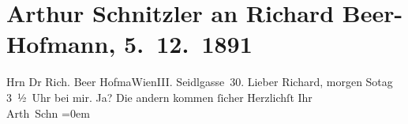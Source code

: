 

         
         \renewcommand{\erwaehntePersonen}{Personen: Richard Beer-Hofmann, Hugo von Hofmannsthal, Felix Salten}
         \renewcommand{\erwaehnteOrte}{Orte: III., Landstraße, Seidlgasse, Wien}
         \renewcommand{\erwaehnteWerke}{}
               \section[Arthur Schnitzler an Richard Beer-Hofmann, 5. 12. 1891]{ Arthur Schnitzler an Richard Beer-Hofmann, 5. 12. 1891}\nopagebreak{}\rehead{ }\begin{ledgroupsized}[t]{13cm}\normalsize\beginnumbering \toendnotes[C]{\smallbreak\pagebreak[2]} 
\toendnotes[C]{\smallbreak}\pstart{}{\pb}Hrn Dr Rich. Beer Hofma{\geminationn}\pend{}\pstart{}Wien\pend{}\pstart{}III. Seidlgasse 30.\pend{}{\bigskip}\pstart
           \noindent{}{\pb}Lieber Richard, morgen So{\geminationn}tag{ }3 ½ Uhr bei mir. Ja? Die andern kommen ſicher \pend
           \pstart
           Herzlichſt Ihr{\\[\baselineskip]}\spacefill\mbox{Arth Schn}\pend
           \leftskip=0em{}
         
         \endnumbering{}\end{ledgroupsized}  \newcommand{\dateiname}{L00047}\newcommand{\titel}{Arthur Schnitzler an Richard Beer-Hofmann, 5. 12. 1891}\newcommand{\editorInnen}{Martin Anton Müller und Gerd-Hermann Susen}
      